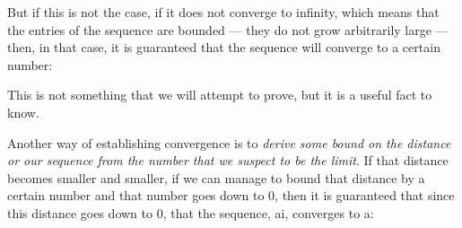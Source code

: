 \documentclass[pdftex, brazil, 12pt, twoside]{article}
\begin{document}
\begin{figure}[H]
  \begin{center}
  \end{center}
\end{figure}

But if this is not the case, if it does not converge to
infinity, which means that the entries of the
sequence are bounded ---
they do not grow arbitrarily large ---
then, in that case, it is guaranteed that the sequence
will converge to a certain number:

\begin{figure}[H]
  \begin{center}
  \end{center}
\end{figure}

This is not something that we will attempt to prove, but it
is a useful fact to know.

Another way of establishing convergence is to \emph{derive some
bound on the distance or our sequence from the number that
we suspect to be the limit}.
If that distance becomes smaller and smaller, if we can
manage to bound that distance by a certain number and that
number goes down to 0, then it is guaranteed that since this
distance goes down to 0, that the sequence, ai,
converges to a:

\begin{figure}[H]
  \begin{center}
  \end{center}
\end{figure}
\end{document}
